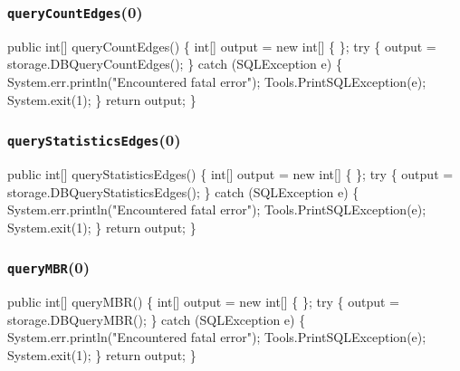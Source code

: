 \documentclass{article}
\def\nwendcode{\endtrivlist \endgroup}      %
\let\nwdocspar=\par
\begin{document}
\subsubsection{{\tt{}\protect{}queryCountEdges}(0)}
\nwenddocs{}\plusendmoddef
public int[] queryCountEdges() \{
  int[] output = new int[] \{ \};
  try \{
    output = storage.DBQueryCountEdges();
  \} catch (SQLException e) \{
    System.err.println("Encountered fatal error");
    Tools.PrintSQLException(e);
    System.exit(1);
  \}
  return output;
\}
\eatline
{}\nwendcode{}\nwdocspar
\subsubsection{{\tt{}\protect{}queryStatisticsEdges}(0)}
\nwenddocs{}\plusendmoddef
public int[] queryStatisticsEdges() \{
  int[] output = new int[] \{ \};
  try \{
    output = storage.DBQueryStatisticsEdges();
  \} catch (SQLException e) \{
    System.err.println("Encountered fatal error");
    Tools.PrintSQLException(e);
    System.exit(1);
  \}
  return output;
\}
\eatline
{}\nwendcode{}\nwdocspar
\subsubsection{{\tt{}\protect{}queryMBR}(0)}
\nwenddocs{}\plusendmoddef
public int[] queryMBR() \{
  int[] output = new int[] \{ \};
  try \{
    output = storage.DBQueryMBR();
  \} catch (SQLException e) \{
    System.err.println("Encountered fatal error");
    Tools.PrintSQLException(e);
    System.exit(1);
  \}
  return output;
\}
\eatline
{}\nwendcode{}\nwdocspar
\end{document}
